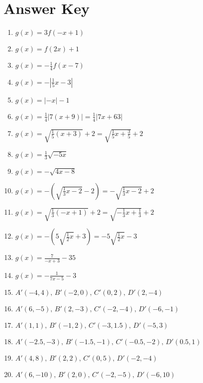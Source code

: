 \newpage

\section{Answer Key}

\begin{enumerate}
	\item $g(x) = 3f(-x+1)$
	\item $g(x) = f(2x)+1$
	\item $g(x) = -\frac{1}{4}f(x-7)$
    \item $g(x) = -\left|\frac{1}{5}x-3\right|$
    \item $g(x) = |-x|-1$
    \item $g(x) = \frac{1}{4}|7(x+9)| = \frac{1}{4}|7x+63|$
    \item $g(x) = \sqrt{\frac{1}{5}(x+3)} + 2 = \sqrt{\frac{1}{5}x + \frac{3}{5}}+2$
    \item $g(x) = \frac{1}{3}\sqrt{-5x}$
    \item $g(x) = -\sqrt{4x-8}$
    \item $g(x) = -\left(\sqrt{\frac{1}{3}x-2}-2\right) = -\sqrt{\frac{1}{3}x-2}+2$
    \item $g(x) = \sqrt{\frac{1}{3}(-x+1)}+2 = \sqrt{-\frac{1}{3}x+\frac{1}{3}}+2$
    \item $g(x) = -\left(5\sqrt{\frac{1}{2}x}+3\right) = -5\sqrt{\frac{1}{2}x} - 3$
    \item $g(x) = \frac{7}{-x+3} - 35$
    \item $g(x) = -\frac{1}{7x-5} - 3$ 
    \item $A'(-4,4), \, B'(-2,0), \, C'(0,2), \, D'(2,-4)$
    \item $A'(6,-5), \, B'(2,-3), \, C'(-2, -4), \, D'(-6,-1)$
    \item $A'(1,1), \, B'(-1,2), \, C'(-3,1.5), \, D'(-5,3)$
    \item $A'(-2.5,-3), \, B'(-1.5,-1), \, C'(-0.5,-2), \, D'(0.5,1)$
    \item $A'(4,8), \, B'(2,2), \, C'(0,5), \, D'(-2,-4)$
    \item $A'(6,-10), \, B'(2,0), \, C'(-2,-5), \, D'(-6,10)$
\end{enumerate}
